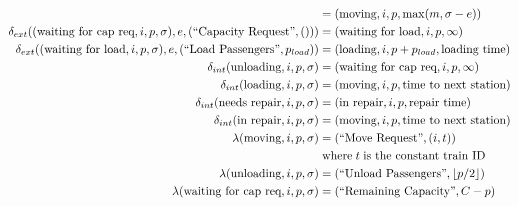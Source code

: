 \begin{align*}
        &= (\text{moving}, i, p, \max(m, \sigma - e)) \\
    \delta_{ext}((\text{waiting for cap req}, i, p, \sigma), e, \InCapReq) &=
        (\text{waiting for load}, i, p, \infty) \\
    \delta_{ext}((\text{waiting for load}, i, p, \sigma), e, \InLoadPassengers{p_{load}}) &=
        (\text{loading}, i, p + p_{load}, \text{loading time}) \\
    \delta_{int}(\text{unloading}, i, p, \sigma) &= 
        (\text{waiting for cap req}, i, p, \infty) \\
    \delta_{int}(\text{loading}, i, p, \sigma) &= (\text{moving}, i, p,
        \text{time to next station}) \\
    \delta_{int}(\text{needs repair}, i, p, \sigma) &= 
        (\text{in repair}, i, p, \text{repair time}) \\
    \delta_{int}(\text{in repair}, i, p, \sigma) &= 
        (\text{moving}, i, p, \text{time to next station}) \\
    \lambda(\text{moving}, i, p, \sigma) &= \OutMoveReq{(i, t)} \\ 
        & \text{\;where\;} t \text{\;is the constant train ID} \\
    \lambda(\text{unloading}, i, p, \sigma) &= \OutUnloadPassengers{\floor*{p/2}} \\
    \lambda(\text{waiting for cap req}, i, p, \sigma) &= \OutRemainingCapacity{C - p}
\end{align*}


